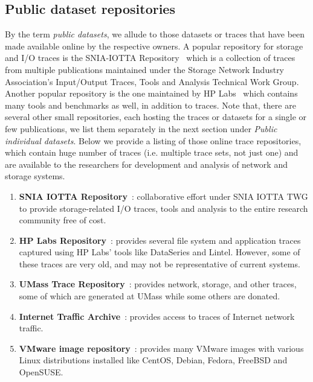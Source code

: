 \subsection{Public dataset repositories}
By the term \textit{public datasets}, we allude to those datasets or 
traces that have 
been made available online by the respective owners. 
A popular repository for
storage and I/O traces is the SNIA-IOTTA Repository~\cite{snia-iotta-repo} which 
is a collection of traces from multiple publications maintained under
the Storage Network Industry Association's Input/Output Traces, Tools and 
Analysis Technical Work Group. Another popular repository
is the one maintained by HP Labs~\cite{hplabs-repo} which 
contains many tools and benchmarks as well, in addition to traces. 
Note that, there are several other small repositories, each hosting the traces 
or datasets for a single or few publications, we list them separately in 
the next section under \textit{Public individual datasets}.
Below we provide a listing of those online trace repositories, 
which contain huge number of traces (i.e. multiple trace sets, not just one)
and are available to the researchers for development and analysis of network 
and storage systems.
\begin{enumerate}
	\item \textbf{SNIA IOTTA Repository}~\cite{snia-iotta-repo}: collaborative effort under SNIA IOTTA TWG to provide storage-related I/O traces, tools and analysis to the entire research community free of cost.
	\item \textbf{HP Labs Repository}~\cite{hplabs-repo}: provides several file system and application traces captured using HP Labs' tools like DataSeries and Lintel. However, some of these traces are very old, and may not be representative of current systems.
	\item \textbf{UMass Trace Repository}~\cite{umass-repo}: provides network, storage, and other traces, some of which are generated at UMass while some others are donated.
	\item \textbf{Internet Traffic Archive}~\cite{ita-repo}: provides access to traces of Internet network traffic. 
	\item \textbf{VMware image repository}~\cite{thoughtpolice-repo}: provides many VMware images with various Linux distributions installed like CentOS, Debian, Fedora, FreeBSD and OpenSUSE.
\end{enumerate}

